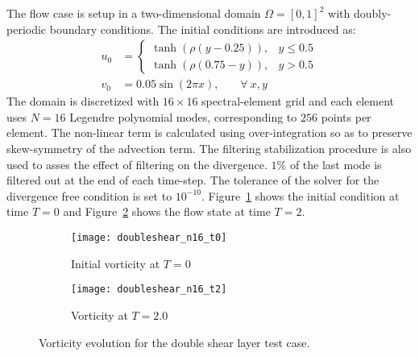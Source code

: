 The flow case is setup in a two-dimensional domain $\Omega=[0,1]^{2}$ with doubly-periodic boundary conditions. The initial conditions are introduced as:
\begin{align}
 u_{0} &= 
 \begin{cases}
    	\tanh(\rho(y-0.25)),		& y \leq 0.5 \\
    	\tanh(\rho(0.75-y)),  	& y > 0.5
 \end{cases} \\
 v_{0} &= 0.05\sin(2\pi x),	\hspace{22pt}\forall\ x,y \nonumber
\end{align}
The domain is discretized with $16\times16$ spectral-element grid and each element uses $N=16$ Legendre polynomial modes, corresponding to $256$ points per element. The non-linear term is calculated using over-integration so as to preserve skew-symmetry of the advection term. The filtering stabilization procedure is also used to asses the effect of filtering on the divergence. $1\%$ of the last mode is filtered out at the end of each time-step. The tolerance of the solver for the divergence free condition is set to $10^{-10}$. Figure~\ref{fig:doubleshear_t0} shows the initial condition at time $T=0$ and Figure~\ref{fig:doubleshear_t2} shows the flow state at time $T=2$.

\begin{figure}[h]
	\centering
	\begin{subfigure}[b]{0.45\textwidth}
		\centering
		\texttt{[image: doubleshear\_n16\_t0]}
		\caption{Initial vorticity at $T=0$}
		\label{fig:doubleshear_t0}
	\end{subfigure}
	\begin{subfigure}[b]{0.45\textwidth}
		\centering
		\texttt{[image: doubleshear\_n16\_t2]}
		\caption{Vorticity at $T=2.0$}
		\label{fig:doubleshear_t2}
	\end{subfigure}
	\caption{Vorticity evolution for the double shear layer test case. }
	\label{fig:doubleshear_soln}
\end{figure}

